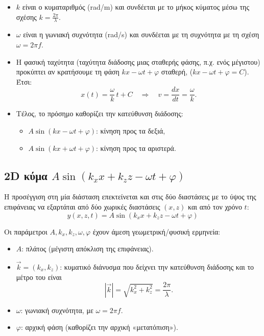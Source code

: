 \begin{itemize}
\item
  \(k\) είναι ο κυματαριθμός (rad/m) και συνδέεται με το μήκος κύματος
  μέσω της σχέσης \(k=\frac{2\pi}{\lambda}\).
\item
  \(\omega\) είναι η γωνιακή συχνότητα (rad/s) και συνδέεται με τη
  συχνότητα με τη σχέση \(\omega=2\pi f\).
\item
  Η φασική ταχύτητα (ταχύτητα διάδοσης μιας σταθερής φάσης, π.χ. ενός
  μέγιστου) προκύπτει αν κρατήσουμε τη φάση \(kx-\omega t+\varphi\)
  σταθερή, (\(kx-\omega t+\varphi = C\)). Έτσι: \[
  x(t)=\frac{\omega}{k}\,t+C
  \quad\Rightarrow\quad
  v=\frac{dx}{dt}=\frac{\omega}{k}.
  \]
\item
  Τέλος, το πρόσημο καθορίζει την κατεύθυνση διάδοσης:

  \begin{itemize}
  \item
    \(A\sin(kx-\omega t+\varphi)\): κίνηση προς τα δεξιά,
  \item
    \(A\sin(kx+\omega t+\varphi)\): κίνηση προς τα αριστερά.
  \end{itemize}
\end{itemize}

\subsection{\texorpdfstring{2D κύμα
\(A\sin(k_x x + k_z z - \omega t + \varphi)\)}{2D κύμα A\textbackslash sin(k\_x x + k\_z z - \textbackslash omega t + \textbackslash varphi)}}\label{d-ux3baux3cdux3bcux3b1-asink_x-x-k_z-z---omega-t-varphi}

Η προσέγγιση στη μία διάσταση επεκτείνεται και στις δύο διαστάσεις με το
ύψος της επιφάνειας να εξαρτάται από δύο χωρικές διαστάσεις \((x,z)\)
και από τον χρόνο \(t\):
\[y(x,z,t)=A\sin(k_x x + k_z z - \omega t + \varphi)\]

Οι παράμετροι \(A, k_x, k_z, \omega, \varphi\) έχουν άμεση
γεωμετρική/φυσική ερμηνεία:

\begin{itemize}
\item
  \(A\): πλάτος (μέγιστη απόκλιση της επιφάνειας).
\item
  \(\vec{k}=(k_x,k_z)\): κυματικό διάνυσμα που δείχνει την κατεύθυνση
  διάδοσης και το μέτρο του είναι \[
  |\vec{k}|=\sqrt{k_x^2+k_z^2}=\frac{2\pi}{\lambda}.
  \]
\item
  \(\omega\): γωνιακή συχνότητα, με \(\omega=2\pi f\).
\item
  \(\varphi\): αρχική φάση (καθορίζει την αρχική «μετατόπιση»).
\end{itemize}

